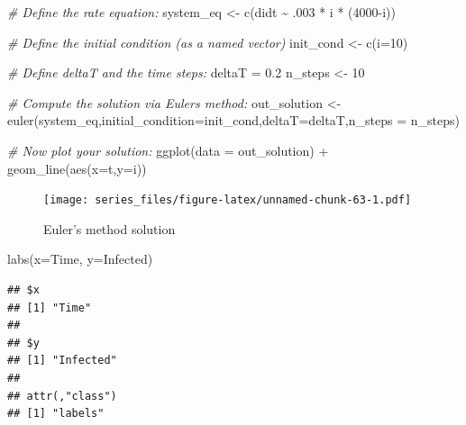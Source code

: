 \documentclass[
]{book}
\newenvironment{Shaded}{\begin{snugshade}}{\end{snugshade}}
\newcommand{\AttributeTok}[1]{\textcolor[rgb]{0.77,0.63,0.00}{#1}}
\newcommand{\CommentTok}[1]{\textcolor[rgb]{0.56,0.35,0.01}{\textit{#1}}}
\newcommand{\DecValTok}[1]{\textcolor[rgb]{0.00,0.00,0.81}{#1}}
\newcommand{\FloatTok}[1]{\textcolor[rgb]{0.00,0.00,0.81}{#1}}
\newcommand{\FunctionTok}[1]{\textcolor[rgb]{0.00,0.00,0.00}{#1}}
\newcommand{\NormalTok}[1]{#1}
\newcommand{\OtherTok}[1]{\textcolor[rgb]{0.56,0.35,0.01}{#1}}
\newcommand{\SpecialCharTok}[1]{\textcolor[rgb]{0.00,0.00,0.00}{#1}}
\newcommand{\StringTok}[1]{\textcolor[rgb]{0.31,0.60,0.02}{#1}}
\theoremstyle{definition}
\theoremstyle{definition}
\theoremstyle{definition}
\theoremstyle{remark}
\begin{document}
\begin{Shaded}
\begin{Highlighting}[]
\CommentTok{\# Define the rate equation:}
\NormalTok{system\_eq }\OtherTok{\textless{}{-}} \FunctionTok{c}\NormalTok{(didt }\SpecialCharTok{\textasciitilde{}}\NormalTok{ .}\DecValTok{003} \SpecialCharTok{*}\NormalTok{ i }\SpecialCharTok{*}\NormalTok{ (}\DecValTok{4000}\SpecialCharTok{{-}}\NormalTok{i))}

\CommentTok{\# Define the initial condition (as a named vector)}
\NormalTok{init\_cond }\OtherTok{\textless{}{-}} \FunctionTok{c}\NormalTok{(}\AttributeTok{i=}\DecValTok{10}\NormalTok{)}

\CommentTok{\# Define deltaT and the time steps:}
\NormalTok{deltaT }\OtherTok{=} \FloatTok{0.2}
\NormalTok{n\_steps }\OtherTok{\textless{}{-}} \DecValTok{10}

\CommentTok{\# Compute the solution via Euler\textquotesingle{}s method:}
\NormalTok{out\_solution }\OtherTok{\textless{}{-}} \FunctionTok{euler}\NormalTok{(system\_eq,}\AttributeTok{initial\_condition=}\NormalTok{init\_cond,}\AttributeTok{deltaT=}\NormalTok{deltaT,}\AttributeTok{n\_steps =}\NormalTok{ n\_steps)}


\CommentTok{\# Now plot your solution:}
\FunctionTok{ggplot}\NormalTok{(}\AttributeTok{data =}\NormalTok{ out\_solution) }\SpecialCharTok{+}
  \FunctionTok{geom\_line}\NormalTok{(}\FunctionTok{aes}\NormalTok{(}\AttributeTok{x=}\NormalTok{t,}\AttributeTok{y=}\NormalTok{i)) }
\end{Highlighting}
\end{Shaded}

\begin{figure}
\centering
\texttt{[image: series\_files/figure-latex/unnamed-chunk-63-1.pdf]}
\caption{\label{fig:unnamed-chunk-63}Euler's method solution}
\end{figure}

\begin{Shaded}
\begin{Highlighting}[]
  \FunctionTok{labs}\NormalTok{(}\AttributeTok{x=}\StringTok{\textquotesingle{}Time\textquotesingle{}}\NormalTok{,}
         \AttributeTok{y=}\StringTok{\textquotesingle{}Infected\textquotesingle{}}\NormalTok{)}
\end{Highlighting}
\end{Shaded}

\begin{verbatim}
## $x
## [1] "Time"
## 
## $y
## [1] "Infected"
## 
## attr(,"class")
## [1] "labels"
\end{verbatim}
\end{document}

